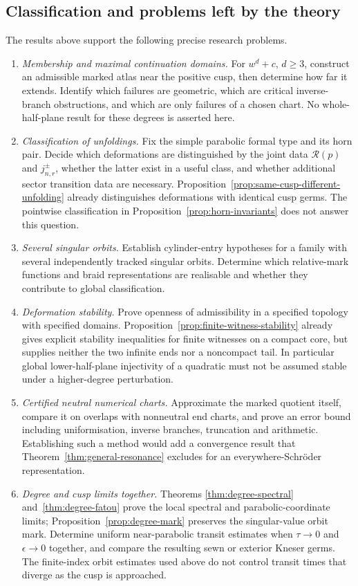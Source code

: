 \documentclass[11pt]{article}
\begin{document}
\subsection{Classification and problems left by the theory}
The results above support the following precise research problems.
\begin{enumerate}
\item \emph{Membership and maximal continuation domains.} For $w^d+c$,
  $d\ge3$, construct an admissible marked atlas near the positive cusp,
  then determine how far it extends. Identify which failures are
  geometric, which are critical inverse-branch obstructions, and which
  are only failures of a chosen chart. No whole-half-plane result for
  these degrees is asserted here.
\item \emph{Classification of unfoldings.} Fix the simple parabolic
  formal type and its horn pair. Decide which deformations are
  distinguished by the joint data $\mathcal R(p)$ and $j_{n,r}^\pm$,
  whether the latter exist in a useful class, and whether additional
  sector transition data are necessary. Proposition~\ref{prop:same-cusp-different-unfolding}
  already distinguishes deformations with identical cusp germs.
  The pointwise classification in
  Proposition~\ref{prop:horn-invariants} does not answer this question.
\item \emph{Several singular orbits.} Establish cylinder-entry
  hypotheses for a family with several independently tracked singular
  orbits. Determine which relative-mark functions and braid representations
  are realisable and whether they contribute to global classification.
\item \emph{Deformation stability.} Prove openness of admissibility in
  a specified topology with specified domains.
  Proposition~\ref{prop:finite-witness-stability} already gives explicit
  stability inequalities for finite witnesses on a compact core,
  but supplies neither the two infinite ends nor a noncompact tail.
  In particular global lower-half-plane injectivity of a quadratic
  must not be assumed stable under a higher-degree perturbation.
\item \emph{Certified neutral numerical charts.} Approximate the marked
  quotient itself, compare it on overlaps with nonneutral end charts,
  and prove an error bound including uniformisation, inverse branches,
  truncation and arithmetic. Establishing such a method would add a
  convergence result that Theorem~\ref{thm:general-resonance} excludes
  for an everywhere-Schr\"oder representation.
\item \emph{Degree and cusp limits together.} Theorems
  \ref{thm:degree-spectral} and~\ref{thm:degree-fatou} prove the local
  spectral and parabolic-coordinate limits; Proposition~\ref{prop:degree-mark}
  preserves the singular-value orbit mark. Determine uniform
  near-parabolic transit estimates when $\tau\to0$ and $\epsilon\to0$
  together, and compare the resulting sewn or exterior Kneser germs.
  The finite-index orbit estimates used above do not control transit
  times that diverge as the cusp is approached.
\end{enumerate}
\end{document}
